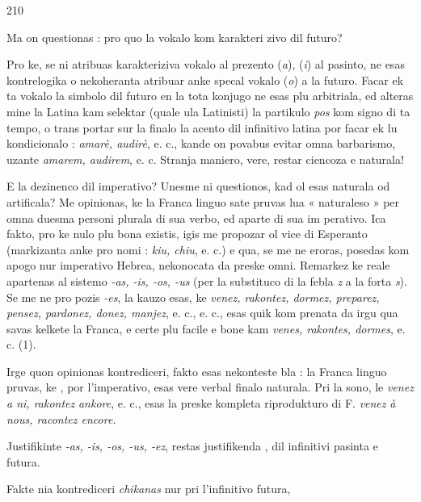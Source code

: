 \begin{VUpage}[214]{210}

Ma on questionas : pro quo la vokalo  kom karakteri\cc
zivo dil futuro?

Pro ke, se ni atribuas karakteriziva vokalo al prezento\nl
(\textit{a}),  (\textit{i}) al pasinto, ne esas kontrelogika o nekoheranta\nl
atribuar anke specal vokalo (\textit{o}) a la futuro. Facar ek ta\nl
vokalo la simbolo dil futuro en la tota konjugo ne esas plu\nl
arbitriala, ed alteras mine la Latina kam selektar (quale ula\nl
Latinisti) la partikulo \textit{pos} kom signo di ta tempo, o trans\cc
portar sur la finalo la acento dil infinitivo latina por facar\nl
ek lu kondicionalo : \textit{amarè, audirè}, e. c., kande on povabus\nl
evitar omna barbarismo, uzante \textit{amarem, audirem}, e. c.\nl
Stranja maniero, vere, restar ciencoza e naturala!

E la dezinenco  dil imperativo? Unesme ni questionos,\nl
kad ol esas naturala od artificala? Me opinionas, ke la\nl
Franca linguo sate pruvas lua « naturaleso » per omna\nl
duesma personi plurala di sua verbo, ed aparte di sua im\cc
perativo. Ica fakto, pro ke nulo plu bona existis, igis me\nl
propozar ol vice  di Esperanto (markizanta anke pro\cc
nomi : \textit{kiu, chiu}, e. c.) e qua, se me ne eroras, posedas kom\nl
apogo nur imperativo Hebrea, nekonocata da preske omni.\nl
Remarkez ke  reale apartenas al sistemo \textit{-as, -is, -os, -us}\nl
(per la substituco di la febla \textit{z} a la forta \textit{s}). Se me ne pro\cc
pozis \textit{-es}, la kauzo esas, ke \textit{venez, rakontez, dormez, preparez,}\nl
\textit{pensez, pardonez, donez, manjez}, e. c., e. c., esas quik kom\cc
prenata da irgu qua savas kelkete la Franca, e certe plu\nl
facile e bone kam \textit{venes, rakontes, dormes}, e. c. (1).

Irge quon opinionas kontrediceri, fakto esas nekonteste\cc
bla : la Franca linguo pruvas, ke , por l'imperativo, esas\nl
vere verbal finalo naturala. Pri la sono, le \textit{venez a ni, rakontez}\nl
\textit{ankore}, e. c., esas la preske kompleta riprodukturo di F. \textit{venez}\nl
\textit{à nous, racontez encore.}

Justifikinte \textit{-as, -is, -os, -us, -ez}, restas justifikenda ,\nl
{} dil infinitivi pasinta e futura.

Fakte nia kontrediceri \textit{chikanas} nur pri l'infinitivo futura,\parplein
\end{VUpage}

